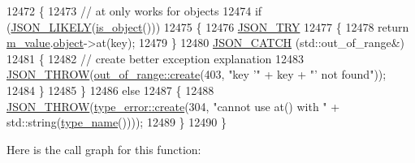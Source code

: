 \begin{DoxyCode}
12472     \{
12473         \textcolor{comment}{// at only works for objects}
12474         \textcolor{keywordflow}{if} (\hyperlink{json_8hpp_a41ecd1c4cf7c3d56477b9b685b5daa72}{JSON\_LIKELY}(\hyperlink{classnlohmann_1_1basic__json_af8f511af124e82e4579f444b4175787c}{is\_object}()))
12475         \{
12476             \hyperlink{json_8hpp_a985d3b82445302c57257f6432f261fe9}{JSON\_TRY}
12477             \{
12478                 \textcolor{keywordflow}{return} \hyperlink{classnlohmann_1_1basic__json_aeb0814f76966f99290cb29e127c90a77}{m\_value}.\hyperlink{unionnlohmann_1_1basic__json_1_1json__value_a4a2209bb26e7088cd36bf24824ab5521}{object}->at(key);
12479             \}
12480             \hyperlink{json_8hpp_a6954bec49ed2a2dfb938c1131c82740a}{JSON\_CATCH} (std::out\_of\_range&)
12481             \{
12482                 \textcolor{comment}{// create better exception explanation}
12483                 \hyperlink{json_8hpp_a6c274f6db2e65c1b66c7d41b06ad690f}{JSON\_THROW}(\hyperlink{classnlohmann_1_1detail_1_1out__of__range_a3f6d82a6f967c4728a1ec735a7867073}{out\_of\_range::create}(403, \textcolor{stringliteral}{"key '"} + key + \textcolor{stringliteral}{"' not
       found"}));
12484             \}
12485         \}
12486         \textcolor{keywordflow}{else}
12487         \{
12488             \hyperlink{json_8hpp_a6c274f6db2e65c1b66c7d41b06ad690f}{JSON\_THROW}(\hyperlink{classnlohmann_1_1detail_1_1type__error_aecc083aea4b698c33d042670ba50c10f}{type\_error::create}(304, \textcolor{stringliteral}{"cannot use at() with "} + 
      std::string(\hyperlink{classnlohmann_1_1basic__json_a9d0a478571f82f0163b96b2424cd998f}{type\_name}())));
12489         \}
12490     \}
\end{DoxyCode}
Here is the call graph for this function\+:
\mbox{\label{classnlohmann_1_1basic__json_acac9d438c9bb12740dcdb01069293a34}} 
